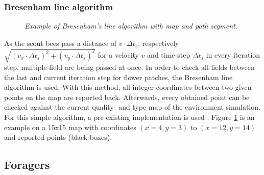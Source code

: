 	\subsubsection{Bresenham line algorithm}
		\label{chap:bresenhamAlgorithm}
		\begin{figure}[H]
			\centering
			\caption{\textit{Example of Bresenham's line algorithm with map and path segment.}}
			\label{fig:bresenham}
		\end{figure}
		As the scout bees pass a distance of $v \cdot \Delta t_s$, respectively $\sqrt{(v_x \cdot \Delta t_s)^2 + (v_y \cdot \Delta t_s)^2}$ for a velocity $v$ and time step $\Delta t_s$ in every iteration step, multiple field are being passed at once. In order to check all fields between the last and current iteration step for flower patches, the Bresenham line algorithm is used. With this method, all integer coordinates between two given points on the map are reported back. Afterwards, every obtained point can be checked against the current quality- and type-map of the environment simulation.
		For this simple algorithm, a pre-existing implementation is used \cite{MVTB}. Figure \ref{fig:bresenham} is an example on a 15x15 map with coordinates $(x = 4, y = 3)$ to $(x = 12, y = 14)$ and reported points (black boxes).

\subsection{Foragers}
